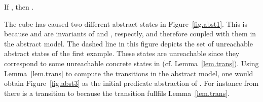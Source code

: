 \documentclass{eptcs}
\begin{document}
\begin{theorem}
\label{theo.approx}
If , then . \vspace{-0ex}
\end{theorem}

\noindent
The cube  has caused two
different abstract states in Figure~\ref{fig.abst1}. This is because  and  are invariants of 
 and , respectly, and therefore coupled with them in the abstract model.
The dashed line in this figure depicts the set of unreachable
abstract states of the first example. These states are unreachable since they correspond to some 
unreachable concrete states in  (cf. Lemma~\ref{lem.trans}).
Using Lemma~\ref{lem.trans} to compute the transitions in the abstract model, 
one would obtain Figure~\ref{fig.abst3} as the initial predicate abstraction
of . For instance from  there is a transition to
 because the transition  fullfils  Lemma~\ref{lem.trans}.
\end{document}
